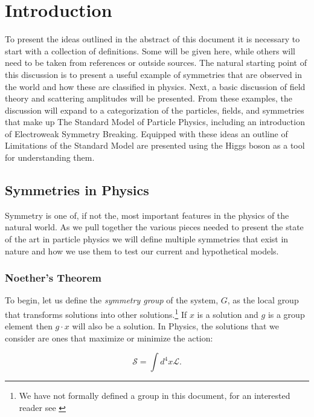 \chapter{Introduction}
\label{sec:intro}

To present the ideas outlined in the abstract of this document it is necessary to start with a collection of definitions. Some will be given here, while others will need to be taken from references or outside sources. The natural starting point of this discussion is to present a useful example of symmetries that are observed in the world and how these are classified in physics. Next, a basic discussion of field theory and scattering amplitudes will be presented. From these examples, the discussion will expand to a categorization of the particles, fields, and symmetries that make up The Standard Model of Particle Physics, including an introduction of Electroweak Symmetry Breaking. Equipped with these ideas an outline of Limitations of the Standard Model are presented using the Higgs boson as a tool for understanding them.

\section{Symmetries in Physics}
\label{sec:Symmetries}

Symmetry is one of, if not the, most important features in the physics of the natural world. As we pull together the various pieces needed to present the state of the art in particle physics we will define multiple symmetries that exist in nature and how we use them to test our current and hypothetical models.

\subsection{Noether's Theorem}
\label{sec:Noether}

To begin, let us define the \textit{symmetry group} of the system, $G$, as the local group that transforms solutions into other solutions.\footnote{We have not formally defined a group in this document, for an interested reader see \cite{Armstrong:1988,Miller:1972,Oliver:1993,Tung:1985}} If $x$ is a solution and $g$ is a group element then $ g \cdot x$ will also be a solution. In Physics, the solutions that we consider are ones that maximize or minimize the action:  

\begin{equation}
\label{eq:action}
\mathcal{S} = \int d^{4}x{\mathscr{L}}.
\end{equation}

